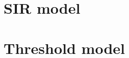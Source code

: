 \begin{figure}[H]
\begin{subfigure}{0.45\textwidth}
{            }
            \caption{}
            \label{diff_sis_er}
        \end{subfigure}
        \begin{subfigure}{0.45\textwidth}
            \caption{}
            \label{diff_sis_ba}
        \end{subfigure}
        \begin{subfigure}{0.45\textwidth}
            \caption{}
            \label{diff_sis_comparison}
        \end{subfigure}
    \end{figure}

\section{SIR model} %
\label{sec:sir_model}


\section{Threshold model} %
\label{sec:threshold_model}

